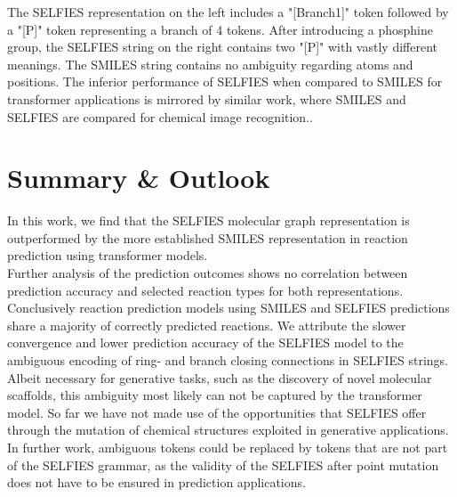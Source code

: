 \documentclass[10pt,conference,compsocconf]{IEEEtran}
\begin{document}
The SELFIES representation on the left includes a "[Branch1]" token followed by a "[P]" token representing a branch of 4 tokens. After introducing a phosphine group, the SELFIES string on the right contains two "[P]" with vastly different meanings. The SMILES string contains no ambiguity regarding atoms and positions. The inferior performance of SELFIES when compared to SMILES for transformer applications is mirrored by similar work, where SMILES and SELFIES are compared for chemical image recognition.\cite{Rajan2021}.

\section{Summary \& Outlook}
In this work, we find that the SELFIES molecular graph representation is outperformed by the more established SMILES representation in reaction prediction using transformer models.\\
Further analysis of the prediction outcomes shows no correlation between prediction accuracy and selected reaction types for both representations. Conclusively reaction prediction models using SMILES and SELFIES predictions share a majority of correctly predicted reactions. We attribute the slower convergence and lower prediction accuracy of the SELFIES model to the ambiguous encoding of ring- and branch closing connections in SELFIES strings. Albeit necessary for generative tasks, such as the discovery of novel molecular scaffolds, this ambiguity most likely can not be captured by the transformer model. So far we have not made use of the opportunities that SELFIES offer through the mutation of chemical structures exploited in generative applications. In further work, ambiguous tokens could be replaced by tokens that are not part of the SELFIES grammar, as the validity of the SELFIES after point mutation does not have to be ensured in prediction applications.


\newpage


\end{document}
